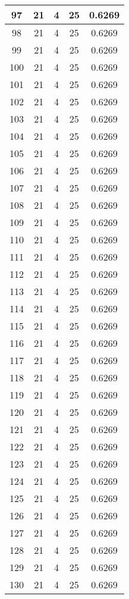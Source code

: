 \documentclass[letterpaper, 12pt]{article}
\begin{document}
\begin{longtable}{|c|c|c|c|c|}
\hline
97 & 21 & 4 & 25 & 0.6269 \\
\hline
98 & 21 & 4 & 25 & 0.6269 \\
\hline
99 & 21 & 4 & 25 & 0.6269 \\
\hline
100 & 21 & 4 & 25 & 0.6269 \\
\hline
101 & 21 & 4 & 25 & 0.6269 \\
\hline
102 & 21 & 4 & 25 & 0.6269 \\
\hline
103 & 21 & 4 & 25 & 0.6269 \\
\hline
104 & 21 & 4 & 25 & 0.6269 \\
\hline
105 & 21 & 4 & 25 & 0.6269 \\
\hline
106 & 21 & 4 & 25 & 0.6269 \\
\hline
107 & 21 & 4 & 25 & 0.6269 \\
\hline
108 & 21 & 4 & 25 & 0.6269 \\
\hline
109 & 21 & 4 & 25 & 0.6269 \\
\hline
110 & 21 & 4 & 25 & 0.6269 \\
\hline
111 & 21 & 4 & 25 & 0.6269 \\
\hline
112 & 21 & 4 & 25 & 0.6269 \\
\hline
113 & 21 & 4 & 25 & 0.6269 \\
\hline
114 & 21 & 4 & 25 & 0.6269 \\
\hline
115 & 21 & 4 & 25 & 0.6269 \\
\hline
116 & 21 & 4 & 25 & 0.6269 \\
\hline
117 & 21 & 4 & 25 & 0.6269 \\
\hline
118 & 21 & 4 & 25 & 0.6269 \\
\hline
119 & 21 & 4 & 25 & 0.6269 \\
\hline
120 & 21 & 4 & 25 & 0.6269 \\
\hline
121 & 21 & 4 & 25 & 0.6269 \\
\hline
122 & 21 & 4 & 25 & 0.6269 \\
\hline
123 & 21 & 4 & 25 & 0.6269 \\
\hline
124 & 21 & 4 & 25 & 0.6269 \\
\hline
125 & 21 & 4 & 25 & 0.6269 \\
\hline
126 & 21 & 4 & 25 & 0.6269 \\
\hline
127 & 21 & 4 & 25 & 0.6269 \\
\hline
128 & 21 & 4 & 25 & 0.6269 \\
\hline
129 & 21 & 4 & 25 & 0.6269 \\
\hline
130 & 21 & 4 & 25 & 0.6269 \\

\end{longtable}
\end{document}
